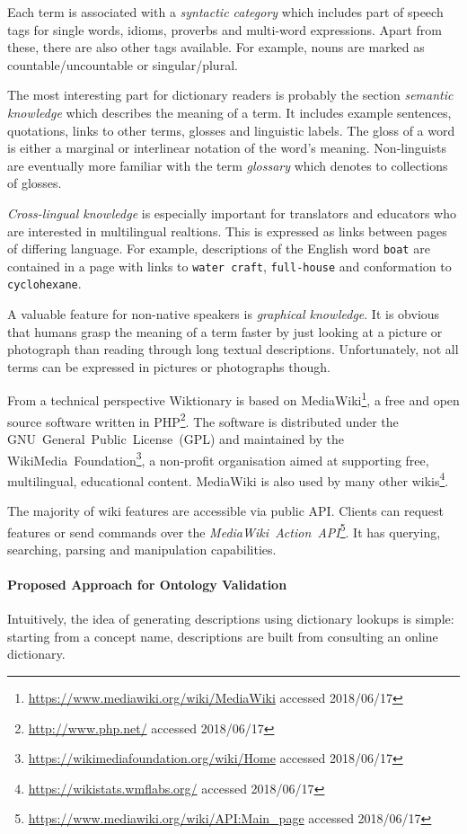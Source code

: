 \documentclass[draft,final]{vutinfth} %
\begin{document}
Each term is associated with a \textit{syntactic category} which includes part of speech tags for single words, idioms, proverbs and multi-word expressions. Apart from these, there are also other tags available. For example, nouns are marked as countable/uncountable or singular/plural. 

The most interesting part for dictionary readers is probably the section \textit{semantic knowledge} which describes the meaning of a term. It includes example sentences, quotations, links to other terms, glosses and linguistic labels. The gloss of a word is either a marginal or interlinear notation of the word's meaning. Non-linguists are eventually more familiar with the term \emph{glossary} which denotes to collections of glosses. 

\textit{Cross-lingual knowledge} is especially important for translators and educators who are interested in multilingual realtions. This is expressed as links between pages of differing language. For example, descriptions of the English word \texttt{boat} are contained in a page with links to \texttt{water~craft}, \texttt{full-house} and conformation to \texttt{cyclohexane}.

A valuable feature for non-native speakers is \emph{graphical knowledge}. It is obvious that humans grasp the meaning of a term faster by just looking at a picture or photograph than reading through long textual descriptions. Unfortunately, not all terms can be expressed in pictures or photographs though. 

From a technical perspective Wiktionary is based on MediaWiki\footnote{\url{https://www.mediawiki.org/wiki/MediaWiki} accessed 2018/06/17}, a free and open source software written in PHP\footnote{\url{http://www.php.net/} accessed 2018/06/17}. The software is distributed under the GNU~General~Public~License~(GPL) and maintained by the WikiMedia~Foundation\footnote{\url{https://wikimediafoundation.org/wiki/Home} accessed 2018/06/17}, a non-profit organisation aimed at supporting free, multilingual, educational content. MediaWiki is also used by many other wikis\footnote{\url{https://wikistats.wmflabs.org/} accessed 2018/06/17}.

The majority of wiki features are accessible via public API. Clients can request features or send commands over the \textit{MediaWiki~Action~API}\footnote{\url{https://www.mediawiki.org/wiki/API:Main_page} accessed 2018/06/17}. It has querying, searching, parsing and manipulation capabilities.

\paragraph{Proposed Approach for Ontology Validation} Intuitively, the idea of generating descriptions using dictionary lookups is simple: starting from a concept name, descriptions are built from consulting an online dictionary. 
\end{document}
